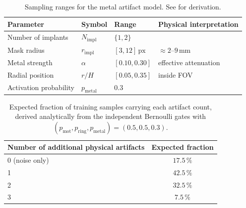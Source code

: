 \begin{table}[!htb]
    \centering
    \caption[Metal artifact parameters (reproduced from ).]{%
        Sampling ranges for the metal artifact model. See  for derivation.}
    \label{tab:app_metal_params}
    \setlength{\tabcolsep}{4pt}
    \small
    \begin{tabular}{@{}llll@{}}
        \toprule
        Parameter & Symbol & Range & Physical interpretation \\
        \midrule
        Number of implants      & $N_\mathrm{impl}$  & $\{1,2\}$           & \\
        Mask radius             & $r_\mathrm{impl}$  & $[3,12]\,\text{px}$ & $\approx2$--$9\,\text{mm}$ \\
        Metal strength          & $\alpha$           & $[0.10,0.30]$       & effective attenuation \\
        Radial position         & $r/H$              & $[0.05,0.35]$       & inside FOV \\
        Activation probability  & $p_\mathrm{metal}$ & $0.3$               & \\
        \bottomrule
    \end{tabular}
\end{table}

\begin{table}[!htb]
    \centering
    \caption[Expected compound artifact distribution.]{%
        Expected fraction of training samples carrying each artifact count, derived analytically
        from the independent Bernoulli gates with
        $(p_\mathrm{mot}, p_\mathrm{ring}, p_\mathrm{metal}) = (0.5, 0.5, 0.3)$.}
    \label{tab:app_compound_probs}
    \begin{tabular}{lc}
        \toprule
        Number of additional physical artifacts & Expected fraction \\
        \midrule
        0 (noise only)  & $17.5\,\%$ \\
        1               & $42.5\,\%$ \\
        2               & $32.5\,\%$ \\
        3               & $7.5\,\%$  \\
        \bottomrule
    \end{tabular}
\end{table}
